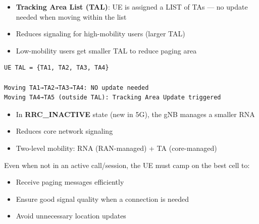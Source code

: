 
\begin{itemize}
\tightlist
\item
  \textbf{Tracking Area List (TAL)}: UE is assigned a LIST of TAs — no update needed when moving within the list
\item
  Reduces signaling for high-mobility users (larger TAL)
\item
  Low-mobility users get smaller TAL to reduce paging area
\end{itemize}

\def\CNcodelang{}

\begin{CNplaincode}
\begin{Verbatim}
UE TAL = {TA1, TA2, TA3, TA4}

Moving TA1→TA2→TA3→TA4: NO update needed
Moving TA4→TA5 (outside TAL): Tracking Area Update triggered
\end{Verbatim}
\end{CNplaincode}


\begin{itemize}
\tightlist
\item
  In \textbf{RRC\_\allowbreak{}INACTIVE} state (new in 5G), the gNB manages a smaller RNA
\item
  Reduces core network signaling
\item
  Two-level mobility: RNA (RAN-managed) + TA (core-managed)
\end{itemize}



\CNchained{}

Even when not in an active call/\allowbreak{}session, the UE must camp on the best cell to:

\begin{itemize}
\tightlist
\item
  Receive paging messages efficiently
\item
  Ensure good signal quality when a connection is needed
\item
  Avoid unnecessary location updates
\end{itemize}



